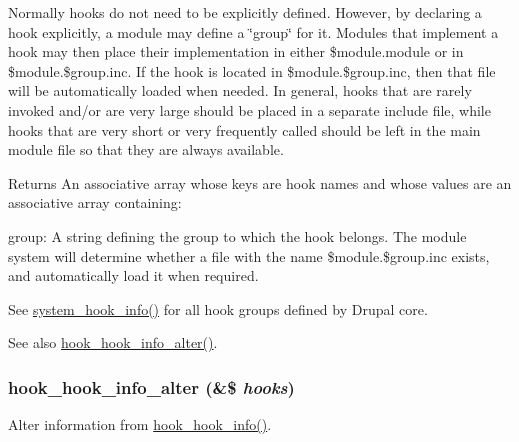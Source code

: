 Normally hooks do not need to be explicitly defined. However, by declaring a hook explicitly, a module may define a \char`\"{}group\char`\"{} for it. Modules that implement a hook may then place their implementation in either \$module.module or in \$module.\$group.inc. If the hook is located in \$module.\$group.inc, then that file will be automatically loaded when needed. In general, hooks that are rarely invoked and/or are very large should be placed in a separate include file, while hooks that are very short or very frequently called should be left in the main module file so that they are always available.

\begin{DoxyReturn}{Returns}
An associative array whose keys are hook names and whose values are an associative array containing:
\begin{DoxyItemize}
\item group: A string defining the group to which the hook belongs. The module system will determine whether a file with the name \$module.\$group.inc exists, and automatically load it when required.
\end{DoxyItemize}
\end{DoxyReturn}
See \hyperlink{system_8module_a9df96726c754189e19b7f065bcb5c833}{system\_\-hook\_\-info()} for all hook groups defined by Drupal core.

\begin{DoxySeeAlso}{See also}
\hyperlink{group__hooks_gaa02e3983f86b09fc29d5e795fd943cb1}{hook\_\-hook\_\-info\_\-alter()}. 
\end{DoxySeeAlso}
\hypertarget{group__hooks_gaa02e3983f86b09fc29d5e795fd943cb1}{
\subsubsection[{hook\_\-hook\_\-info\_\-alter}]{\setlength{\rightskip}{0pt plus 5cm}hook\_\-hook\_\-info\_\-alter (\&\$ {\em hooks})}}
\label{group__hooks_gaa02e3983f86b09fc29d5e795fd943cb1}
Alter information from \hyperlink{group__hooks_ga65142e7864f445483786087d180a2010}{hook\_\-hook\_\-info()}.


